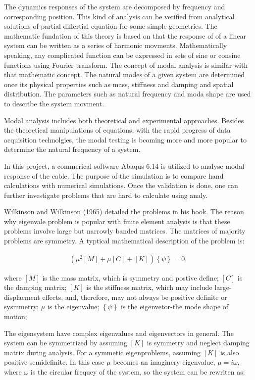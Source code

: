 \documentclass[paper=a4, fontsize=11pt]{scrartcl} %
\numberwithin{equation}{section} %
\numberwithin{figure}{section} %
\numberwithin{table}{section} %
\begin{document}
The dynamics responses of the system are decomposed by frequency and
corresponding position. This kind of analysis can be verified from
analytical solutions of partial differtial equation for some simple
geometries. The mathematic fundation of this theory is based on that
the response of of a linear system can be written as a series of
harmonic movments. Mathematically speaking, any complicated function
can be expressed in sets of sine or consine functions using Fourier
transform. The concept of modal analysis is similar with that
mathematic concept. The natural modes of a given system are determined
once its physical properties such as mass, stiffness and damping and
spatial distribution. The parameters such as natural frequency and
moda shape are used to describe the system movment.

Modal analysis includes both theoretical and experimental approaches.
Besides the theoretical manipulations of equations, with the rapid
progress of data acquisition technolgies, the modal testing is bcoming
more and more popular to determine the natural frequency of a system.

In this project, a commerical software Abaqus 6.14 is utilized to
analyse modal response of the cable. The purpose of the simulation is
to compare hand calculations with numerical simulations. Once the
validation is done, one can further investigate problems that are hard
to calculate using analy.

Wilkinson and Wilkinson (1965) detailed the problems in his book. The
reason why eigenvale problem is popular with finite element analysis
is that these problems involve large but narrowly banded matrices. The
matrices of majority problems are symmetry. A typtical mathematical
description of the problem is:

\begin{align}
\left(\mu^2\left[M\right]+\mu\left[C\right]+\left[K\right]\right)\left\{\psi\right\}=0,
\end{align}

where $[M]$ is the mass matrix, which is symmetry and postive define;
$[C]$ is the damping matrix; $[K]$ is the stiffness matrix, which may
include large-displacment effects, and, therefore, may not always be
positive definite or sysmmetry; $\mu$ is the eigenvalue;
$\left\{\psi\right\}$ is the eigenvetor-the mode shape of motion;

The eigensystem have complex eigenvalues and eigenvectors in general.
The system can be symmetrized by assuming $[K]$ is symmetry and neglect
damping matrix during analysis. For a symmetic eigenproblems, assuming
$[K]$ is also positive semidefinite. In this case $\mu$ becomes an
imaginery eigenvalue, $\mu=i\omega$, where $\omega$ is the circular
frequey of the system, so the system can be rewriten as:
\end{document}
